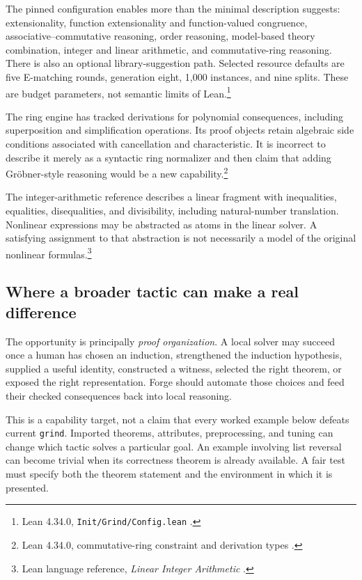\documentclass[11pt,a4paper]{article}
\newcommand{\code}[1]{\texttt{#1}}
\begin{document}
The pinned configuration enables more than the minimal description suggests:
extensionality, function extensionality and function-valued congruence,
associative--commutative reasoning, order reasoning, model-based theory
combination, integer and linear arithmetic, and commutative-ring reasoning.
There is also an optional library-suggestion path. Selected resource defaults
are five E-matching rounds, generation eight, 1,000 instances, and nine splits.
These are budget parameters, not semantic limits of Lean.\footnote{Lean 4.34.0,
\code{Init/Grind/Config.lean} \cite{config}.}

The ring engine has tracked derivations for polynomial consequences, including
superposition and simplification operations. Its proof objects retain algebraic
side conditions associated with cancellation and characteristic. It is
incorrect to describe it merely as a syntactic ring normalizer and then claim
that adding Gr\"obner-style reasoning would be a new capability.\footnote{Lean
4.34.0, commutative-ring constraint and derivation types \cite{commring}.}

The integer-arithmetic reference describes a linear fragment with inequalities,
equalities, disequalities, and divisibility, including natural-number
translation. Nonlinear expressions may be abstracted as atoms in the linear
solver. A satisfying assignment to that abstraction is not necessarily a model
of the original nonlinear formulas.\footnote{Lean language reference,
\emph{Linear Integer Arithmetic} \cite{lia}.}

\subsection{Where a broader tactic can make a real difference}
The opportunity is principally \emph{proof organization}. A local solver may
succeed once a human has chosen an induction, strengthened the induction
hypothesis, supplied a useful identity, constructed a witness, selected the
right theorem, or exposed the right representation. Forge should automate those
choices and feed their checked consequences back into local reasoning.

This is a capability target, not a claim that every worked example below defeats
current \code{grind}. Imported theorems, attributes, preprocessing, and tuning
can change which tactic solves a particular goal. An example involving list
reversal can become trivial when its correctness theorem is already available.
A fair test must specify both the theorem statement and the environment in
which it is presented.
\end{document}
